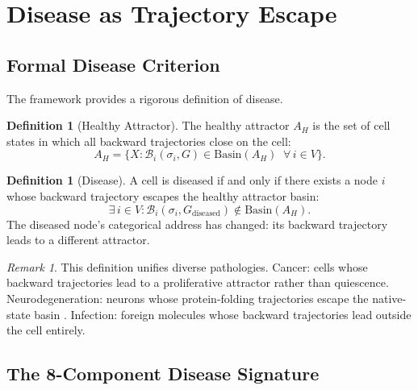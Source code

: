 \documentclass[twocolumn,10pt,a4paper]{article}
\theoremstyle{definition}
\newtheorem{definition}[theorem]{Definition}
\theoremstyle{remark}
\newtheorem{remark}[theorem]{Remark}
\newcommand{\Back}{\mathcal{B}}
\begin{document}
\section{Disease as Trajectory Escape}
\label{sec:disease}

\subsection{Formal Disease Criterion}

The framework provides a rigorous definition of disease.

\begin{definition}[Healthy Attractor]
\label{def:healthy}
The healthy attractor $A_H$ is the set of cell states in which all backward trajectories close on the cell:
\begin{equation}
    A_H = \{X : \Back_i(\sigma_i, G) \in \mathrm{Basin}(A_H) \;\; \forall \, i \in V\}.
\end{equation}
\end{definition}

\begin{definition}[Disease]
\label{def:disease}
A cell is diseased if and only if there exists a node $i$ whose backward trajectory escapes the healthy attractor basin:
\begin{equation}
    \exists \, i \in V : \Back_i(\sigma_i, G_{\mathrm{diseased}}) \notin \mathrm{Basin}(A_H).
    \label{eq:disease}
\end{equation}
The diseased node's categorical address has changed: its backward trajectory leads to a different attractor.
\end{definition}

\begin{remark}
This definition unifies diverse pathologies. Cancer: cells whose backward trajectories lead to a proliferative attractor rather than quiescence. Neurodegeneration: neurons whose protein-folding trajectories escape the native-state basin \citep{Levinthal1969}. Infection: foreign molecules whose backward trajectories lead outside the cell entirely.
\end{remark}

\subsection{The 8-Component Disease Signature}
\end{document}
